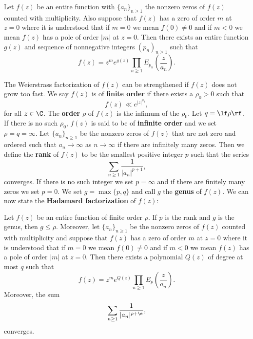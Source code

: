     \begin{theorem}
      Let $f(z)$ be an entire function with $\{a_{n}\}_{n \ge 1}$ the nonzero zeros of $f(z)$ counted with multiplicity. Also suppose that $f(z)$ has a zero of order $m$ at $z = 0$ where it is understood that if $m = 0$ we mean $f(0) \neq 0$ and if $m < 0$ we mean $f(z)$ has a pole of order $|m|$ at $z = 0$. Then there exists an entire function $g(z)$ and sequence of nonnegative integers $(p_{n})_{n \ge 1}$ such that
      \[
        f(z) = z^{m}e^{g(z)}\prod_{n \ge 1}E_{p_{n}}\left(\frac{z}{a_{n}}\right).
      \]
    \end{theorem}

    The Weierstrass factorization of $f(z)$ can be strengthened if $f(z)$ does not grow too fast. We say $f(z)$ is of \textbf{finite order} if there exists a $\rho_{0} > 0$ such that
    \[
      f(z) \ll e^{|z|^{\rho_{0}}},
    \]
    for all $z \in \C$. The \textbf{order} $\rho$ of $f(z)$ is the infimum of the $\rho_{0}$. Let $q = \lf \rho \rf$. If there is no such $\rho_{0}$, $f(z)$ is said to be of \textbf{infinite order} and we set $\rho = q = \infty$. Let $\{a_{n}\}_{n \ge 1}$ be the nonzero zeros of $f(z)$ that are not zero and ordered such that $a_{n} \to \infty$ as $n \to \infty$ if there are infinitely many zeros. Then we define the \textbf{rank} of $f(z)$ to be the smallest positive integer $p$ such that the series
    \[
      \sum_{n \ge 1}\frac{1}{|a_{n}|^{p+1}},
    \]
    converges. If there is no such integer we set $p = \infty$ and if there are finitely many zeros we set $p = 0$. We set $g = \max\{p,q\}$ and call $g$ the \textbf{genus} of $f(z)$. We can now state the \textbf{Hadamard factorization} of $f(z)$:

    \begin{theorem}
      Let $f(z)$ be an entire function of finite order $\rho$. If $p$ is the rank and $g$ is the genus, then $g \le \rho$. Moreover, let $\{a_{n}\}_{n \ge 1}$ be the nonzero zeros of $f(z)$ counted with multiplicity and suppose that $f(z)$ has a zero of order $m$ at $z = 0$ where it is understood that if $m = 0$ we mean $f(0) \neq 0$ and if $m < 0$ we mean $f(z)$ has a pole of order $|m|$ at $z = 0$. Then there exists a polynomial $Q(z)$ of degree at most $q$ such that
      \[
        f(z) = z^{m}e^{Q(z)}\prod_{n \ge 1}E_{p}\left(\frac{z}{a_{n}}\right).
      \]
      Moreover, the sum
      \[
        \sum_{n \ge 1}\frac{1}{|a_{n}|^{\rho+\e}},
      \]
      converges.
    \end{theorem}
